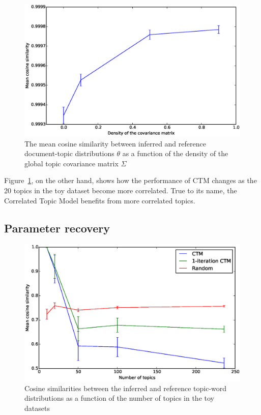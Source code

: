 \documentclass[12pt,a4paper,twoside,openright]{report}
\begin{document}
\begin{figure}[!htb]
\includegraphics[width=\textwidth]{sim-sigmadensity-cosine.eps}
\caption{The mean cosine similarity between inferred and reference document-topic distributions $\theta$ as a function of the density of the global topic covariance matrix $\Sigma$}
\label{fig:sim-sigmadensity-cosine}
\end{figure}

Figure~\ref{fig:sim-sigmadensity-cosine}, on the other hand, shows how the performance of CTM changes as the 20 topics in the toy dataset become more correlated. True to its name, the Correlated Topic Model benefits from more correlated topics.

\subsection{Parameter recovery}

\begin{figure}[!htb]
\includegraphics[width=\textwidth]{sim-beta-cosine.eps}
\caption{Cosine similarities between the inferred and reference topic-word distributions as a function of the number of topics in the toy datasets}
\label{fig:sim-beta-cosine}
\end{figure}
\end{document}
